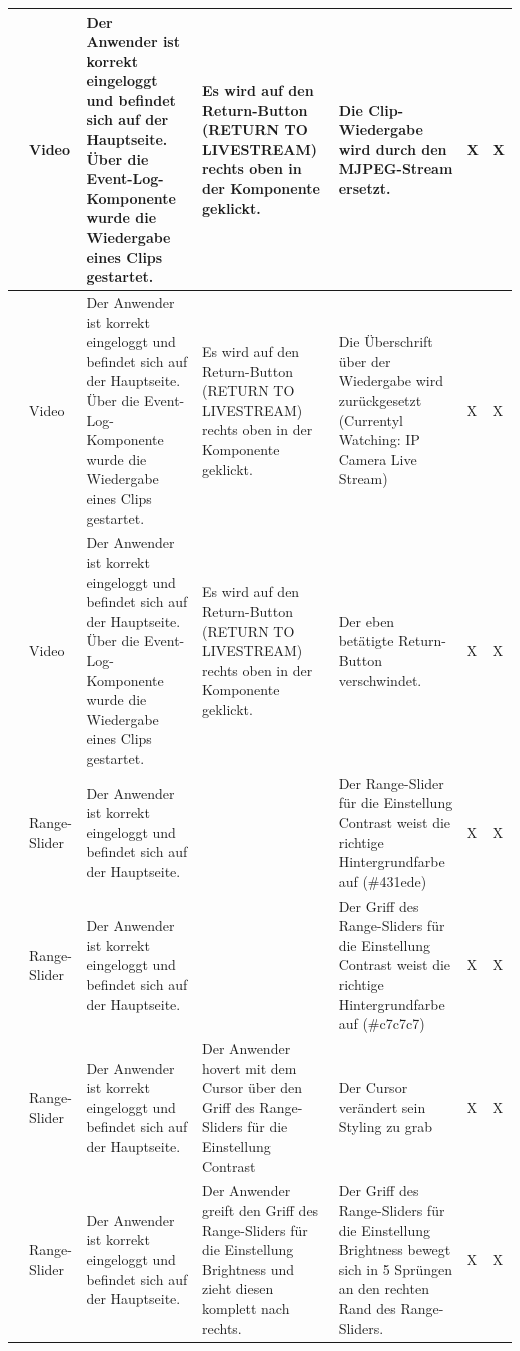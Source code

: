 \begin{longtable}{| p{} | p{} | p{} | p{} | p{} | p{} | p{} |}
	\stepcounter{TestNumber}\arabic{TestNumber} & Video & Der Anwender ist korrekt eingeloggt und befindet sich auf der Hauptseite. Über die Event-Log-Komponente wurde die Wiedergabe eines Clips gestartet. & Es wird auf den Return-Button (RETURN TO LIVESTREAM) rechts oben in der Komponente geklickt. & Die Clip-Wiedergabe wird durch den MJPEG-Stream ersetzt. & X & X \\ \hline
	
	\stepcounter{TestNumber}\arabic{TestNumber} & Video & Der Anwender ist korrekt eingeloggt und befindet sich auf der Hauptseite. Über die Event-Log-Komponente wurde die Wiedergabe eines Clips gestartet. & Es wird auf den Return-Button (RETURN TO LIVESTREAM) rechts oben in der Komponente geklickt. & Die Überschrift über der Wiedergabe wird zurückgesetzt (Currentyl Watching: IP Camera Live Stream) & X & X \\ \hline
	
	\stepcounter{TestNumber}\arabic{TestNumber} & Video & Der Anwender ist korrekt eingeloggt und befindet sich auf der Hauptseite. Über die Event-Log-Komponente wurde die Wiedergabe eines Clips gestartet. & Es wird auf den Return-Button (RETURN TO LIVESTREAM) rechts oben in der Komponente geklickt. & Der eben betätigte Return-Button verschwindet. & X & X \\ \hline
	
	\stepcounter{TestNumber}\arabic{TestNumber} & Range-Slider & Der Anwender ist korrekt eingeloggt und befindet sich auf der Hauptseite. & & Der Range-Slider für die Einstellung Contrast weist die richtige Hintergrundfarbe auf (\#431ede) & X & X \\ \hline

	\stepcounter{TestNumber}\arabic{TestNumber} & Range-Slider & Der Anwender ist korrekt eingeloggt und befindet sich auf der Hauptseite. & & Der Griff des Range-Sliders für die Einstellung Contrast weist die richtige Hintergrundfarbe auf (\#c7c7c7) & X & X \\ \hline
	
	\stepcounter{TestNumber}\arabic{TestNumber} & Range-Slider & Der Anwender ist korrekt eingeloggt und befindet sich auf der Hauptseite. & Der Anwender hovert mit dem Cursor über den Griff des Range-Sliders für die Einstellung Contrast & Der Cursor verändert sein Styling zu grab & X & X \\ \hline
	
	\stepcounter{TestNumber}\arabic{TestNumber} & Range-Slider & Der Anwender ist korrekt eingeloggt und befindet sich auf der Hauptseite. & Der Anwender greift den Griff des Range-Sliders für die Einstellung Brightness und zieht diesen komplett nach rechts. & Der Griff des Range-Sliders für die Einstellung Brightness bewegt sich in 5 Sprüngen an den rechten Rand des Range-Sliders. & X & X \\ \hline
	

\end{longtable}
